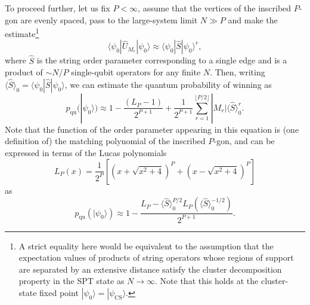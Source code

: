 \documentclass[prb,twocolumn,showpacs,amssymb,superscriptaddress]{revtex4-2}
\begin{document}
To proceed further, let us fix $P < \infty$, assume that the vertices of the inscribed $P$-gon are evenly spaced, pass to the large-system limit $N \gg P$ and make the estimate\footnote{A strict equality here would be equivalent to the assumption that the expectation values of products of string operators whose regions of support are separated by an extensive distance satisfy the cluster decomposition property in the SPT state as $N \to \infty$. Note that this holds at the cluster-state fixed point $|\psi_0\rangle = |\psi_{\mathrm{CS}}\rangle$.}
\begin{equation}
\label{eq:stringcluster}
\langle \psi_0 | \hat{U}_{M_r} | \psi_0 \rangle \approx \langle \psi_0 | \hat{S} |  \psi_0\rangle^r,
\end{equation}
where $\hat{S}$ is the string order parameter corresponding to a single edge and is a product of $\sim N/P$ single-qubit operators for any finite $N$. Then, writing $\langle \hat{S} \rangle_0 = \langle \psi_0 | \hat{S} | \psi_0 \rangle$, we can estimate the quantum probability of winning as
\begin{equation}
p_{\mathrm{qu}}(|\psi_0\rangle) \approx 1-\frac{(L_P-1)}{2^{P+1}} + \frac{1}{2^{P+1}}\sum_{r=1}^{\lfloor P/2 \rfloor} |M_r| \langle \hat{S} \rangle_0^{r}.
\end{equation}
Note that the function of the order parameter appearing in this equation is (one definition of) the matching polynomial of the inscribed $P$-gon, and can be expressed in terms of the Lucas polynomials\cite{koshy2019fibonacci}
\begin{equation}
\label{eq:Lucas}
L_P(x) = \frac{1}{2^P}\left[(x+\sqrt{x^2+4})^P +(x-\sqrt{x^2+4})^P\right]
\end{equation}
as
\begin{equation}
\label{eq:qwp}
p_{\mathrm{qu}}(|\psi_0\rangle) \approx 1-\frac{L_P-\langle \hat{S} \rangle_0^{P/2}L_P (\langle \hat{S}\rangle_0^{-1/2} )}{2^{P+1}}.
\end{equation}
\end{document}
